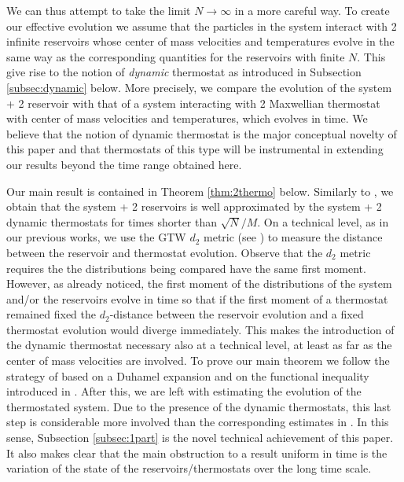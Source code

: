 \documentclass{article}
\begin{document}
We can thus attempt to take the limit $N\to\infty$ in a more careful way. To create our effective evolution we assume
that the particles in the system interact with 2 infinite reservoirs whose center of mass velocities and temperatures
evolve in the same way as the corresponding quantities for the reservoirs with finite $N$. This give rise to the notion
of {\it dynamic} thermostat as introduced in Subsection \ref{subsec:dynamic} below. More precisely, we compare the
evolution of the system + 2 reservoir with that of a system interacting with 2 Maxwellian thermostat with center of mass
velocities and temperatures, which evolves in time. We believe that the notion of dynamic thermostat is the major
conceptual novelty of this paper and that thermostats of this type will be instrumental in extending our results beyond
the time range obtained here.

Our main result is contained in Theorem \ref{thm:2thermo} below. Similarly to \cite{BLP25}, we obtain that the system +
2 reservoirs is well approximated by the system + 2 dynamic thermostats for times shorter than $\sqrt N/M$. On a
technical level, as in our previous works, we use the GTW $d_2$ metric (see \cite{GTW}) to measure the distance between
the reservoir and thermostat evolution. Observe that the $d_2$ metric requires the the distributions being compared have
the same first moment. However, as already noticed, the first moment of the distributions of the system and/or the
reservoirs evolve in time so that if the first moment of a thermostat remained fixed the $d_2$-distance between the
reservoir evolution and a fixed thermostat evolution would diverge immediately. This makes the introduction of the
dynamic thermostat necessary also at a technical level, at least as far as the center of mass velocities are involved.
To prove our main theorem we follow the strategy of \cite{BLP25} based on a Duhamel expansion and on the functional
inequality introduced in \cite[Lemma 3.3]{BLTV}. After this, we are left with estimating the evolution of the
thermostated system. Due to the presence of the dynamic thermostats, this last step is considerable more involved than
the corresponding estimates in \cite{BLP25}. In this sense, Subsection \ref{subsec:1part} is the novel technical
achievement of this paper. It also makes clear that the main obstruction to a result uniform in time is the variation of
the state of the reservoirs/thermostats over the long time scale.
\end{document}
